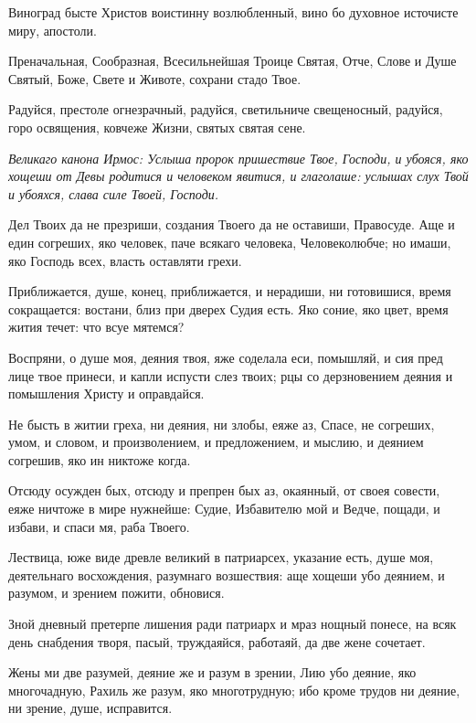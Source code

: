 

Виноград бысте Христов воистинну возлюбленный, вино бо духовное источисте миру, апостоли.




Преначальная, Сообразная, Всесильнейшая Троице Святая, Отче, Слове и Душе Святый, Боже, Свете и Животе, сохрани стадо Твое.




Радуйся, престоле огнезрачный, радуйся, светильниче свещеносный, радуйся, горо освящения, ковчеже Жизни, святых святая сене.


\itshape Великаго канона Ирмос\normalfont{}: Услыша пророк пришествие Твое, Господи, и убояся, яко хощеши от Девы родитися и человеком явитися, и глаголаше: услышах слух Твой и убояхся, слава силе Твоей, Господи.


Дел Твоих да не презриши, создания Твоего да не оставиши, Правосуде. Аще и един согреших, яко человек, паче всякаго человека, Человеколюбче; но имаши, яко Господь всех, власть оставляти грехи.


Приближается, душе, конец, приближается, и нерадиши, ни готовишися, время сокращается: востани, близ при дверех Судия есть. Яко соние, яко цвет, время жития течет: что всуе мятемся?


Воспряни, о душе моя, деяния твоя, яже соделала еси, помышляй, и сия пред лице твое принеси, и капли испусти слез твоих; рцы со дерзновением деяния и помышления Христу и оправдайся.


Не бысть в житии греха, ни деяния, ни злобы, еяже аз, Спасе, не согреших, умом, и словом, и произволением, и предложением, и мыслию, и деянием согрешив, яко ин никтоже когда.


Отсюду осужден бых, отсюду и препрен бых аз, окаянный, от своея совести, еяже ничтоже в мире нужнейше: Судие, Избавителю мой и Ведче, пощади, и избави, и спаси мя, раба Твоего.


Лествица, юже виде древле великий в патриарсех, указание есть, душе моя, деятельнаго восхождения, разумнаго возшествия: аще хощеши убо деянием, и разумом, и зрением пожити, обновися.


Зной дневный претерпе лишения ради патриарх и мраз нощный понесе, на всяк день снабдения творя, пасый, труждаяйся, работаяй, да две жене сочетает.


Жены ми две разумей, деяние же и разум в зрении, Лию убо деяние, яко многочадную, Рахиль же разум, яко многотрудную; ибо кроме трудов ни деяние, ни зрение, душе, исправится.


